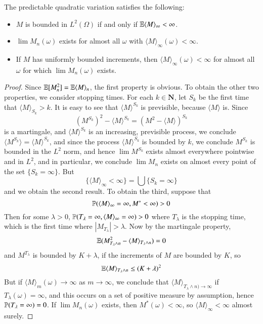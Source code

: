 \begin{theorem}
    The predictable quadratic variation satisfies the following:
    \begin{itemize}
        \item $M$ is bounded in $L^2(\Omega)$ if and only if $\operatorname{\mathbb{E}} \langle M \rangle_\infty < \infty$.

        \item $\lim M_n(\omega)$ exists for almost all $\omega$ with $\langle M \rangle_\infty(\omega) < \infty$.

        \item If $M$ has uniformly bounded increments, then $\langle M \rangle_\infty(\omega) < \infty$ for almost all $\omega$ for which $\lim M_n(\omega)$ exists.
    \end{itemize}
\end{theorem}
\begin{proof}
    Since $\operatorname{\mathbb{E}}[M_n^2] = \operatorname{\mathbb{E}}\langle M \rangle_n$, the first property is obvious. To obtain the other two properties, we consider stopping times. For each $k \in \mathbf{N}$, let $S_k$ be the first time that $\langle M \rangle_{S_k} > k$. It is easy to see that $\langle M \rangle^{S_k}$ is previsible, because $\langle M \rangle$ is. Since
    \[ (M^{S_k})^2 - \langle M \rangle^{S_k} = (M^2 - \langle M \rangle)^{S_k} \]
    is a martingale, and $\langle M \rangle^{S_k}$ is an increasing, previsible process, we conclude $\langle M^{S_k} \rangle = \langle M \rangle^{S_k}$, and since the process $\langle M \rangle^{S_k}$ is bounded by $k$, we conclude $M^{S_k}$ is bounded in the $L^2$ norm, and hence $\lim M^{S_k}$ exists almost everywhere pointwise and in $L^2$, and in particular, we conclude $\lim M_n$ exists on almost every point of the set $\{ S_k = \infty \}$. But
    \[ \{ \langle M \rangle_\infty < \infty \} = \bigcup \{ S_k = \infty \} \]
    and we obtain the second result. To obtain the third, suppose that
    \[ \operatorname{\mathbb{P}}(\langle M \rangle_\infty = \infty, M^* < \infty) > 0 \]
    Then for some $\lambda > 0$, $\operatorname{\mathbb{P}}(T_\lambda = \infty, \langle M \rangle_\infty = \infty) > 0$ where $T_\lambda$ is the stopping time, which is the first time where $|M_{T_\lambda}| > \lambda$. Now by the martingale property,
    \[ \operatorname{\mathbb{E}}(M_{T_\lambda \wedge n}^2 - \langle M \rangle_{T_\lambda \wedge n}) = 0 \]
    and $M^{T_\lambda}$ is bounded by $K + \lambda$, if the increments of $M$ are bounded by $K$, so
    \[ \operatorname{\mathbb{E}} \langle M \rangle_{T_\lambda \wedge n} \leq (K + \lambda)^2 \]
    But if $\langle M \rangle_m(\omega) \to \infty$ as $m \to \infty$, we conclude that $\langle M \rangle_{T_\lambda \wedge n) \to \infty}$ if $T_\lambda(\omega) = \infty$, and this occurs on a set of positive measure by assumption, hence $\operatorname{\mathbb{P}}(T_\lambda = \infty) = 0$. If $\lim M_n(\omega)$ exists, then $M^*(\omega) < \infty$, so $\langle M \rangle_\infty < \infty$ almost surely.
\end{proof}

